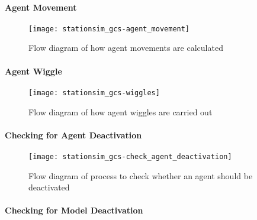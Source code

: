 \paragraph{Agent Movement}\label{para:submodels:agent_movement}

\begin{figure}[h]
    \centering
    \texttt{[image: stationsim\_gcs-agent\_movement]}
    \caption{Flow diagram of how agent movements are calculated}
    \label{fig:flow:agent_movement}
\end{figure}

\paragraph{Agent Wiggle}\label{para:submodels:agent_wiggle}

\begin{figure}[h]
    \centering
    \texttt{[image: stationsim\_gcs-wiggles]}
    \caption{Flow diagram of how agent wiggles are carried out}
    \label{fig:flow:agent_wiggles}
\end{figure}

\paragraph{Checking for Agent
Deactivation}\label{para:submodels:agent_deactivation}

\begin{figure}[h]
    \centering
    \texttt{[image: stationsim\_gcs-check\_agent\_deactivation]}
    \caption{Flow diagram of process to check whether an agent should be
    deactivated}
    \label{fig:flow:check_agent_deactivation}
\end{figure}

\paragraph{Checking for Model
Deactivation}\label{para:submodels:model_deactivation}


